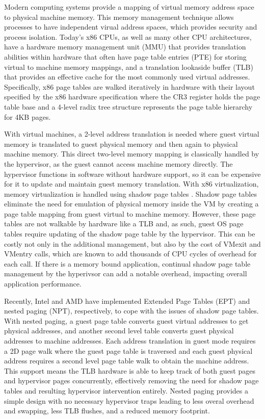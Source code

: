 Modern computing systems provide a mapping of virtual memory address space to physical machine memory. This memory management technique allows processes to have independent virual address spaces, which provides security and process isolation.  Today's x86 CPUs, as well as many other CPU architectures, have a hardware memory management unit (MMU) that provides translation abilities within hardware that often have page table entries (PTE) for storing virtual to machine memory mappings, and a translation lookaside buffer (TLB) that provides an effective cache for the most commonly used virtual addresses.  Specifically, x86 page tables are walked iteratively in hardware with their layout specified by the x86 hardware specification where the CR3 register holds the page table base and a 4-level radix tree structure represents the page table hierarchy for 4KB pages.  

With virtual machines, a 2-level address translation is needed where guest virtual memory is translated to guest physical memory and then again to physical machine memory. This direct two-level memory mapping is classically handled by the hypervisor, as the guest cannot access machine memory directly. The hypervisor functions in software without hardware support, so it can be expensive for it to update and maintain guest memory translation. With x86 virtualization, memory virtualization is handled using shadow page tables \cite{rosenblum2005virtual}. Shadow page tables eliminate the need for emulation of physical memory inside the VM by creating a page table mapping from guest virtual to machine memory. However, these page tables are not walkable by hardware like a TLB and, as such, guest OS page tables require updating of the shadow page table by the hypervisor. This can be costly not only in the additional management, but also by the cost of VMexit and VMentry calls, which are known to add thousands of CPU cycles of overhead for each call.  If there is a memory bound application, continual shadow page table management by the hyperivsor can add a notable overhead, impacting overall application performance.

Recently, Intel and AMD have implemented Extended Page Tables (EPT) and nested paging (NPT), respectively, to cope with the issues of shadow page tables.  With nested paging, a guest page table converts guest virtual addresses to get physical addresses, and another second level table converts guest physical addresses to machine addresses.  Each address translation in guest mode requires a 2D page walk where the guest page table is traversed and each guest physical address requires a second level page table walk to obtain the machine address. This support means the TLB hardware is able to keep track of both guest pages and hypervisor pages concurrently, effectively removing the need for shadow page tables and resulting hypervisor intervention entirely.  Nested paging provides a simple design with no necessary hypervisor traps leading to less overal overhead and swapping, less TLB flushes, and a reduced memory footprint.

